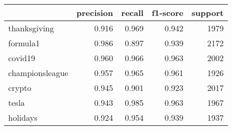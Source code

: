 \begin{tabular}{lrrrr}
\toprule
{} &  precision &  recall &  f1-score &  support \\
\midrule
thanksgiving    &      0.916 &   0.969 &     0.942 &     1979 \\
formula1        &      0.986 &   0.897 &     0.939 &     2172 \\
covid19         &      0.960 &   0.966 &     0.963 &     2002 \\
championsleague &      0.957 &   0.965 &     0.961 &     1926 \\
crypto          &      0.945 &   0.901 &     0.923 &     2017 \\
tesla           &      0.943 &   0.985 &     0.963 &     1967 \\
holidays        &      0.924 &   0.954 &     0.939 &     1937 \\
\bottomrule
\end{tabular}
